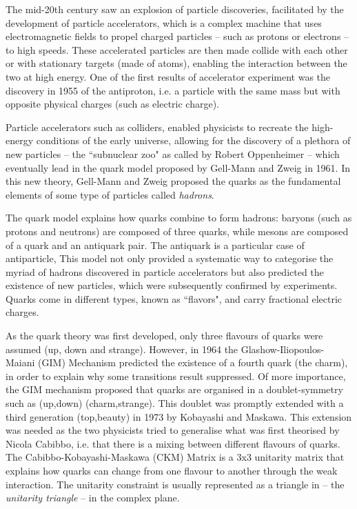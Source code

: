 The mid-20th century saw an explosion of particle discoveries, facilitated by the development of particle accelerators, which is a complex machine that uses electromagnetic fields to propel charged particles -- such as protons or electrons -- to high speeds. These accelerated particles are then made collide with each other or with stationary targets (made of atoms), enabling the interaction between the two at high energy. One of the first results of accelerator experiment was the discovery in 1955 of the antiproton, i.e. a particle with the same mass but with opposite physical charges (such as electric charge). 

Particle accelerators such as colliders, enabled physicists to recreate the high-energy conditions of the early universe, allowing for the discovery of a plethora of new particles -- the ``subnuclear zoo" as called by Robert Oppenheimer -- which eventually lead in the quark model proposed by Gell-Mann and Zweig in 1961. In this new theory,  Gell-Mann and Zweig proposed the quarks as the fundamental elements of some type of particles called \textit{hadrons}. 

The quark model explains how quarks combine to form hadrons: baryons (such as protons and neutrons) are composed of three quarks, while mesons are composed of a quark and an antiquark pair. The antiquark is a particular case of antiparticle,  This model not only provided a systematic way to categorise the myriad of hadrons discovered in particle accelerators but also predicted the existence of new particles, which were subsequently confirmed by experiments. Quarks come in different types, known as ``flavors", and carry fractional electric charges. 

As the quark theory was first developed, only three flavours of quarks were assumed (up, down and strange). However, in 1964 the Glashow-Iliopoulos-Maiani (GIM) Mechanism predicted the existence of a fourth quark (the charm), in order to explain why some transitions result suppressed. Of more importance, the GIM mechanism proposed that quarks are organised in a doublet-symmetry such as (up,down) (charm,strange). This doublet was promptly extended with a third generation (top,beauty) in 1973 by Kobayashi and Maskawa. This extension was needed as the two physicists tried to generalise what was first theorised by Nicola Cabibbo, i.e. that there is a mixing between different flavours of quarks. The Cabibbo-Kobayashi-Maskawa (CKM) Matrix is a 3x3 unitarity matrix that explains how quarks can change from one flavour to another through the weak interaction. The unitarity constraint is usually represented as a triangle in -- the \textit{unitarity triangle} -- in the complex plane.

